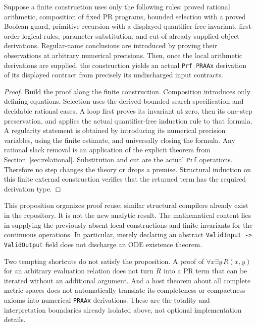 \begin{proposition}
Suppose a finite construction uses only the following rules:
proved rational arithmetic, composition of fixed PR programs, bounded
selection with a proved Boolean guard, primitive recursion with a displayed
quantifier-free invariant, first-order logical rules, parameter substitution,
and cut of already supplied object derivations. Regular-name conclusions
are introduced by proving their observations at arbitrary numerical
precisions. Then, once the local arithmetic derivations are supplied, the
construction yields an actual \texttt{Prf PRAAx} derivation of its displayed
contract from precisely its undischarged input contracts.
\end{proposition}

\begin{proof}
Build the proof along the finite construction. Composition introduces only
defining equations. Selection uses the derived bounded-search specification
and decidable rational cases. A loop first proves its invariant at zero,
then its one-step preservation, and applies the actual quantifier-free
induction rule to that formula. A regularity statement is obtained by
introducing its numerical precision variables, using the finite estimate,
and universally closing the formula. Any rational slack removal is an
application of the explicit theorem from Section~\ref{sec:relational}.
Substitution and cut are the actual \texttt{Prf} operations. Therefore no
step changes the theory or drops a premise. Structural induction on this
finite external construction verifies that the returned term has the
required derivation type.
\end{proof}

This proposition organizes proof reuse; similar structural compilers already
exist in the repository. It is not the new analytic result. The mathematical
content lies in supplying the previously absent local constructions and
finite invariants for the continuous operations. In particular, merely
declaring an abstract \texttt{ValidInput -> ValidOutput} field does not
discharge an ODE existence theorem.

Two tempting shortcuts do not satisfy the proposition. A proof of
$\forall x\exists y\,R(x,y)$ for an arbitrary evaluation relation does not
turn $R$ into a PR term that can be iterated without an additional argument.
And a host theorem about all complete metric spaces does not automatically
translate its completeness or compactness axioms into numerical
\texttt{PRAAx} derivations. These are the totality and interpretation boundaries
already isolated above, not optional implementation details.

